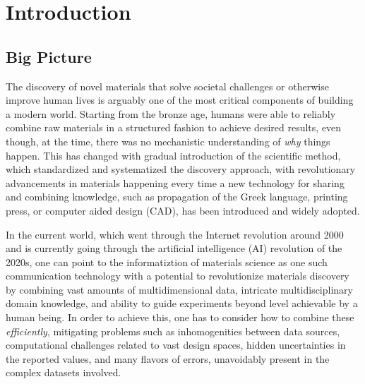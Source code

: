 \chapter{Introduction} \label{sec:Introduction}

\section{Big Picture} \label{intro:sec:bigpicture}

The discovery of novel materials that solve societal challenges or otherwise improve human lives is arguably one of the most critical components of building a modern world. Starting from the bronze age, humans were able to reliably combine raw materials in a structured fashion to achieve desired results, even though, at the time, there was no mechanistic understanding of \emph{why} things happen. This has changed with gradual introduction of the scientific method, which standardized and systematized the discovery approach, with revolutionary advancements in materials happening every time a new technology for sharing and combining knowledge, such as propagation of the Greek language, printing press, or computer aided design (CAD), has been introduced and widely adopted.

In the current world, which went through the Internet revolution around 2000 and is currently going through the artificial intelligence (AI) revolution of the 2020s, one can point to the informatiztion of materials science as one such communication technology with a potential to revolutionize materials discovery by combining vast amounts of multidimensional data, intricate multidisciplinary domain knowledge, and ability to guide experiments beyond level achievable by a human being. In order to achieve this, one has to consider how to combine these \emph{efficiently}, mitigating problems such as inhomogenities between data sources, computational challenges related to vast design spaces, hidden uncertainties in the reported values, and many flavors of errors, unavoidably present in the complex datasets involved.

